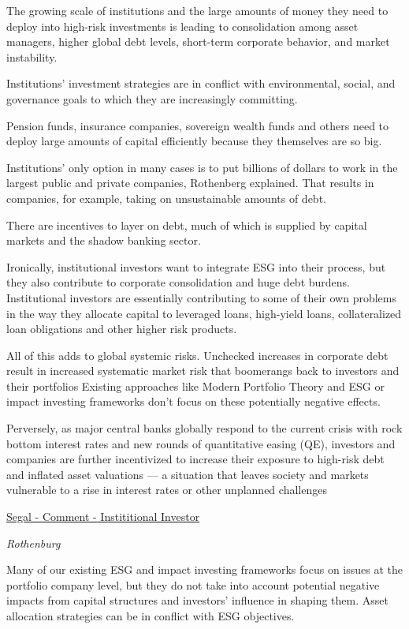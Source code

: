\documentclass[
]{book}
\begin{document}
The growing scale of institutions and the large amounts of money they need to deploy into high-risk investments is leading to consolidation among asset managers, higher global debt levels, short-term corporate behavior, and market instability.

Institutions' investment strategies are in conflict with environmental, social, and governance goals to which they are increasingly committing.

Pension funds, insurance companies, sovereign wealth funds and others need to deploy large amounts of capital efficiently because they themselves are so big.

Institutions' only option in many cases is to put billions of dollars to work in the largest public and private companies, Rothenberg explained. That results in companies, for example, taking on unsustainable amounts of debt.

There are incentives to layer on debt, much of which is supplied by capital markets and the shadow banking sector.

Ironically, institutional investors want to integrate ESG into their process, but they also contribute to corporate consolidation and huge debt burdens. Institutional investors are essentially contributing to some of their own problems in the way they allocate capital to leveraged loans, high-yield loans, collateralized loan obligations
and other higher risk products.

All of this adds to global systemic risks.
Unchecked increases in corporate debt result in increased systematic market risk that boomerangs back to investors and their portfolios
Existing approaches like Modern Portfolio Theory and ESG or impact investing frameworks don't focus on these potentially negative effects.

Perversely, as major central banks globally respond to the current crisis with rock bottom interest rates and new rounds of quantitative easing (QE), investors and companies are further incentivized to increase their exposure to high-risk debt and inflated asset valuations --- a situation that leaves society and markets vulnerable to a rise in interest rates or other unplanned challenges

\href{https://www.institutionalinvestor.com/article/b1r9js87jhyn8s/How-Institutional-Investors-Encourage-Corporations-Bad-Behavior}{Segal - Comment - Instititional Investor}

\emph{Rothenburg}

Many of our existing ESG and impact investing frameworks focus on issues at the
portfolio company level, but they do not take into account potential negative
impacts from capital structures and investors' influence in shaping them.
Asset allocation strategies can be in conflict with ESG objectives.
\end{document}
